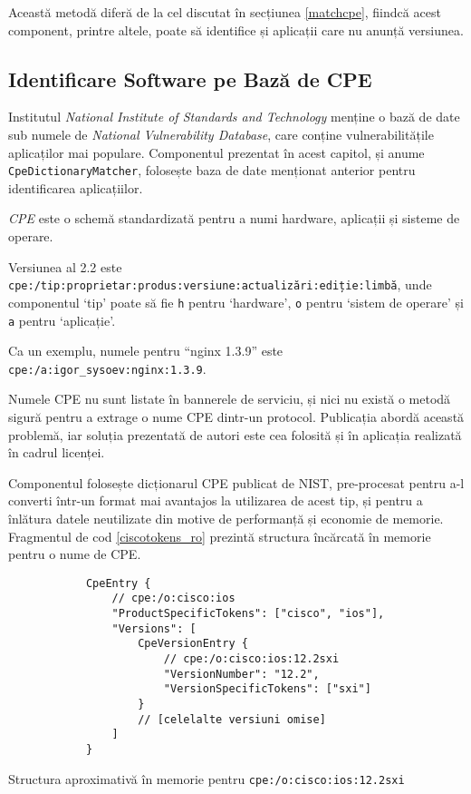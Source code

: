 	Această metodă diferă de la cel discutat în secțiunea \ref{matchcpe}, fiindcă acest component, printre altele, poate să identifice și aplicații care nu anunță versiunea.
	
\subsection*{Identificare Software pe Bază de CPE}

	Institutul \textit{National Institute of Standards and Technology} menține o bază de date sub numele de \textit{National Vulnerability Database}, care conține vulnerabilitățile aplicaților mai populare. Componentul prezentat în acest capitol, și anume \texttt{CpeDictionaryMatcher}, folosește baza de date menționat anterior pentru identificarea aplicațiilor.
	
	\textit{CPE} este o schemă standardizată pentru a numi hardware, aplicații și sisteme de operare\cite{cpe22}.
	
	Versiunea al 2.2 este \texttt{cpe:/tip:proprietar:produs:versiune:actualizări:ediție:limbă}, unde componentul `tip' poate să fie \texttt{h} pentru `hardware', \texttt{o} pentru `sistem de operare' și \texttt{a} pentru `aplicație'.
	
	Ca un exemplu, numele pentru ``nginx 1.3.9'' este \texttt{cpe:/a:igor_sysoev:nginx:1.3.9}.
	
	Numele CPE nu sunt listate în bannerele de serviciu, și nici nu există o metodă sigură pentru a extrage o nume CPE dintr-un protocol. Publicația \cite{shovat15} abordă această problemă, iar soluția prezentată de autori este cea folosită și în aplicația realizată în cadrul licenței.
	
	Componentul folosește dicționarul CPE publicat de NIST, pre-procesat pentru a-l converti într-un format mai avantajos la utilizarea de acest tip, și pentru a înlătura datele neutilizate din motive de performanță și economie de memorie. Fragmentul de cod \ref{ciscotokens_ro} prezintă structura încărcată în memorie pentru o nume de CPE.
	
	\begin{listing}[H]
		\begin{verbatim}
			CpeEntry {
				// cpe:/o:cisco:ios
				"ProductSpecificTokens": ["cisco", "ios"],
				"Versions": [
					CpeVersionEntry {
						// cpe:/o:cisco:ios:12.2sxi
						"VersionNumber": "12.2",
						"VersionSpecificTokens": ["sxi"]
					}
					// [celelalte versiuni omise]
				]
			}
		\end{verbatim}
		\caption{Structura aproximativă în memorie pentru \texttt{cpe:/o:cisco:ios:12.2sxi}}
		\label{ciscotokens_ro}
	\end{listing}
	
